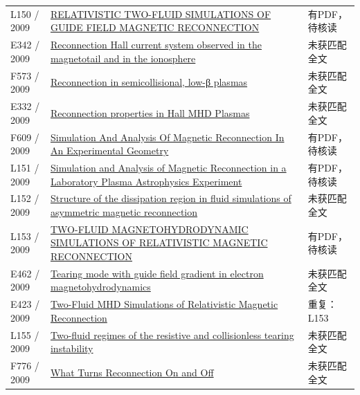 \begin{longtable}{P{24mm}P{97mm}P{27mm}}
L150 / 2009 & \href{https://doi.org/10.1088/0004-637x/705/1/907}{RELATIVISTIC TWO-FLUID SIMULATIONS OF GUIDE FIELD MAGNETIC RECONNECTION} & 有PDF，待核读\\

E342 / 2009 & \href{https://doi.org/10.1029/2009gl037239}{Reconnection Hall current system observed in the magnetotail and in the ionosphere} & 未获匹配全文\\

F573 / 2009 & \href{https://doi.org/10.1063/1.3155453}{Reconnection in semicollisional,  low-β plasmas} & 未获匹配全文\\

E332 / 2009 & \href{http://absimage.aps.org/image/DPP09/MWS_DPP09-2009-000900.pdf}{Reconnection properties in Hall MHD Plasmas} & 未获匹配全文\\

F609 / 2009 & \href{https://doi.org/10.5281/zenodo.47876}{Simulation And Analysis Of Magnetic Reconnection In An Experimental Geometry} & 有PDF，待核读\\

L151 / 2009 & \href{https://doi.org/10.5281/zenodo.16803}{Simulation and Analysis of Magnetic Reconnection in a Laboratory Plasma Astrophysics Experiment} & 有PDF，待核读\\

L152 / 2009 & \href{https://doi.org/10.1063/1.3086867}{Structure of the dissipation region in fluid simulations of asymmetric magnetic reconnection} & 未获匹配全文\\

L153 / 2009 & \href{https://doi.org/10.1088/0004-637x/696/2/1385}{TWO-FLUID MAGNETOHYDRODYNAMIC SIMULATIONS OF RELATIVISTIC MAGNETIC RECONNECTION} & 有PDF，待核读\\

E462 / 2009 & \href{https://doi.org/10.1063/1.3078470}{Tearing mode with guide field gradient in electron magnetohydrodynamics} & 未获匹配全文\\

E423 / 2009 & \href{https://arxiv.org/abs/0902.2074v1}{Two-Fluid MHD Simulations of Relativistic Magnetic Reconnection} & 重复：L153\\

L155 / 2009 & \href{https://doi.org/10.1063/1.3068470}{Two-fluid regimes of the resistive and collisionless tearing instability} & 未获匹配全文\\

F776 / 2009 & \href{https://ntrs.nasa.gov/search.jsp?R=20090012450}{What Turns Reconnection On and Off} & 未获匹配全文\\


\end{longtable}

